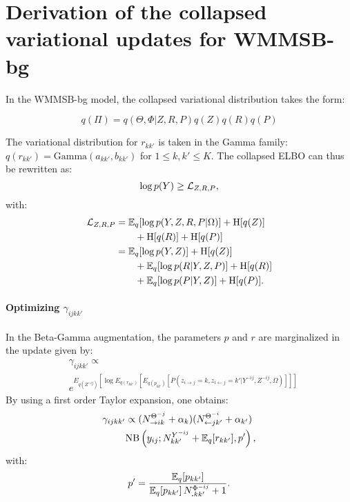
\section{Derivation of the collapsed variational updates for WMMSB-bg}
\label{app:collap}


In the WMMSB-bg model, the collapsed variational distribution takes the form:

\begin{equation*}
q(\Pi) = q(\Theta, \Phi|Z, R, P) q(Z)q(R)q(P)
\end{equation*}

The variational distribution for $r_{kk'}$ is taken in the Gamma family:  $q(r_{kk'}) = \textrm{Gamma}(a_{kk'},b_{kk'})$ for $1\leq k,k' \leq K$. The collapsed ELBO can thus be rewritten as:
%
\[
\log p(Y) \geq \mathcal{L}_{Z,R,P},
\]
%
with:
\begin{align*}
\mathcal{L}_{Z,R,P} &= \mathbb{E}_{q}[\log p(Y, Z, R, P|\Omega)] + \textrm{H}[q(Z)] \\
& \qquad + \textrm{H}[q(R)] + \textrm{H}[q(P)] \\
& = \mathbb{E}_{q}[\log p(Y, Z)] + \textrm{H}[q(Z)] \\
& \qquad + \mathbb{E}_{q}[\log p(R|Y,Z,P)] + \textrm{H}[q(R)] \\
& \qquad +\mathbb{E}_{q}[\log p(P|Y,Z)] + \textrm{H}[q(P)].
\end{align*}

\paragraph{Optimizing $\gamma_{ijkk'}$}

In the Beta-Gamma augmentation, the parameters $p$ and $r$ are marginalized in the update given by:
%
\begin{align*}
&\gamma_{ijkk'} \propto \nonumber\\
&e^{E_{q(Z^{-ij})} [\log E_{q(r_{kk'})}[E_{q(p_{kk'})}[ P(z_{i\rightarrow j}=k, z_{i\leftarrow j}=k' | Y^{-ij}, Z^{-ij}, \Omega) ] ] ]}
\end{align*}
%
By using a first order Taylor expansion, one obtains:
%
\begin{align*}
\gamma_{ijkk'} & \propto (N_{\rightarrow ik}^{\Theta^{-j}} + \alpha_k) (N_{\leftarrow jk'}^{\Theta^{-i}} + \alpha_{k'}) \\
& \mathrm{NB}\left(y_{ij}; N^{Y^{-ij}}_{kk'} + \mathbb{E}_{q}[r_{kk'}], p' \right),
\end{align*}
%
with:
%
\[
p' = \frac{\mathbb{E}_{q}[p_{kk'}]}{\mathbb{E}_{q}[p_{kk'}]\,N^{\Phi^{-ij}}_{\bm{.}kk'} + 1}.
\]

